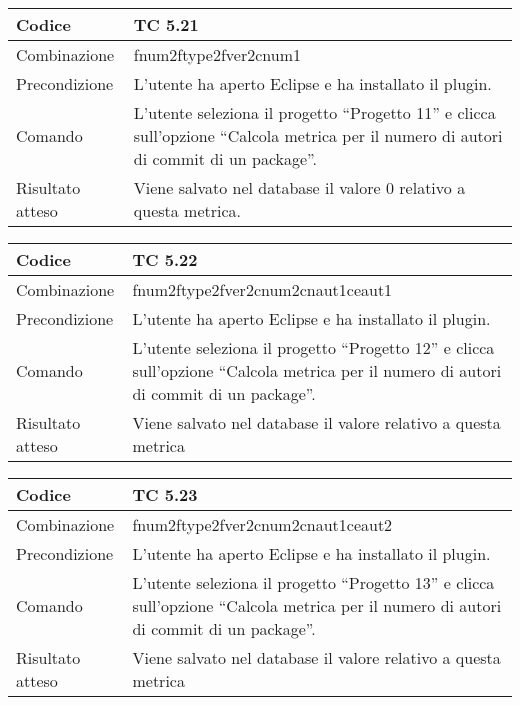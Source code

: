 \begin{table}[ht]
\begin{tabular}{|p{3cm}|p{9cm}|}
\hline
\cellcolor{lightgray}Codice				& TC 5.21								\\
\hline
\cellcolor{lightgray}Combinazione		& fnum2ftype2fver2cnum1									\\
\hline
\cellcolor{lightgray}Precondizione		& L'utente ha aperto Eclipse e ha installato il plugin.		\\
\hline
\cellcolor{lightgray}Comando			& L'utente seleziona il progetto ``Progetto 11''  e clicca sull'opzione ``Calcola metrica per il numero di autori di commit di un package''.	\\
\hline
\cellcolor{lightgray}Risultato atteso	& Viene salvato nel database il valore 0 relativo a questa metrica.\\
\hline
\end{tabular}
\end{table}

\begin{table}[ht]
\begin{tabular}{|p{3cm}|p{9cm}|}
\hline
\cellcolor{lightgray}Codice				& TC 5.22								\\
\hline
\cellcolor{lightgray}Combinazione		& fnum2ftype2fver2cnum2cnaut1ceaut1 									\\
\hline
\cellcolor{lightgray}Precondizione		& L'utente ha aperto Eclipse e ha installato il plugin.				\\
\hline
\cellcolor{lightgray}Comando			& L'utente seleziona il progetto ``Progetto 12''  e clicca sull'opzione ``Calcola metrica per il numero di autori di commit di un package''.	\\
\hline
\cellcolor{lightgray}Risultato atteso	& Viene salvato nel database il valore relativo a questa metrica	\\
\hline
\end{tabular}
\end{table}

\begin{table}[ht]
\begin{tabular}{|p{3cm}|p{9cm}|}
\hline
\cellcolor{lightgray}Codice				& TC 5.23								\\
\hline
\cellcolor{lightgray}Combinazione		& fnum2ftype2fver2cnum2cnaut1ceaut2									\\
\hline
\cellcolor{lightgray}Precondizione		& L'utente ha aperto Eclipse e ha installato il plugin.					\\
\hline
\cellcolor{lightgray}Comando			& L'utente seleziona il progetto ``Progetto 13''  e clicca sull'opzione ``Calcola metrica per il numero di autori di commit di un package''.	\\
\hline
\cellcolor{lightgray}Risultato atteso	& Viene salvato nel database il valore relativo a questa metrica	\\
\hline
\end{tabular}
\end{table}

